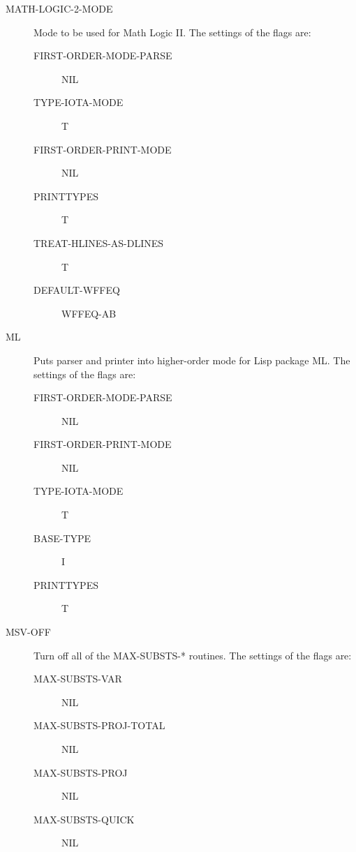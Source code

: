 \begin{description} 
\item[MATH-LOGIC-2-MODE]  
Mode to be used for Math Logic II. The settings of the flags are:
\begin{description}
\item[FIRST-ORDER-MODE-PARSE] NIL

\item[TYPE-IOTA-MODE] T

\item[FIRST-ORDER-PRINT-MODE] NIL

\item[PRINTTYPES] T

\item[TREAT-HLINES-AS-DLINES] T

\item[DEFAULT-WFFEQ] WFFEQ-AB

\end{description}

\item[ML]  
Puts parser and printer into higher-order mode for
Lisp package ML. The settings of the flags are:
\begin{description}
\item[FIRST-ORDER-MODE-PARSE] NIL

\item[FIRST-ORDER-PRINT-MODE] NIL

\item[TYPE-IOTA-MODE] T

\item[BASE-TYPE] I

\item[PRINTTYPES] T

\end{description}

\item[MSV-OFF]  
Turn off all of the MAX-SUBSTS-* routines. The settings of the flags are:
\begin{description}
\item[MAX-SUBSTS-VAR] NIL

\item[MAX-SUBSTS-PROJ-TOTAL] NIL

\item[MAX-SUBSTS-PROJ] NIL

\item[MAX-SUBSTS-QUICK] NIL


\end{description}
\end{description}
